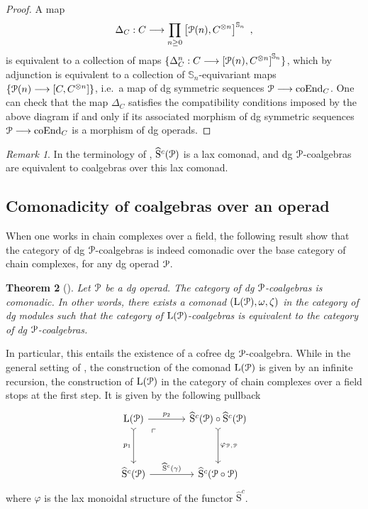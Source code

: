 \documentclass[a4paper,12pt]{amsart}
\renewcommand{\mathcal}{\EuScript}
\newcommand{\oneop}{\mathcal{P}}
\theoremstyle{plain}
\newtheorem{theorem}{Theorem}[section]
\theoremstyle{definition}
\theoremstyle{remark}
\newtheorem{remark}[theorem]{\sc Remark}%
\begin{document}
\begin{proof}
A map 
\[
\Delta_C: C \longrightarrow \displaystyle \prod_{n \geq 0} \left[\mathcal{P}(n),C^{\otimes n}\right]^{\mathbb{S}_n}~,
\]
is equivalent to a collection of maps $\{\Delta_C^n: C \longrightarrow \left[\mathcal{P}(n),C^{\otimes n}\right]^{\mathbb{S}_n}\}$, which by adjunction is equivalent to a collection of $\mathbb S_n$-equivariant maps $\{\mathcal{P}(n) \longrightarrow \left[C,C^{\otimes n}\right]\}$, i.e.\ a map of dg symmetric sequences $\mathcal{P} \longrightarrow \mathrm{coEnd}_C$. One can check that the map $\Delta_C$ satisfies the compatibility conditions imposed by the above diagram if and only if its associated morphism of dg symmetric sequences $\mathcal{P} \longrightarrow \mathrm{coEnd}_C$ is a morphism of dg operads.
\end{proof}

\begin{remark}
In the terminology of \cite{anelcofree2014}, $\widehat{\mathrm{S}}^c(\oneop)$ is a lax comonad, and dg $\oneop$-coalgebras are equivalent to coalgebras over this lax comonad. 
\end{remark}

\subsection{Comonadicity of coalgebras over an operad}
When one works in chain complexes over a field, the following result show that the category of dg $\mathcal{P}$-coalgebras is indeed comonadic over the base category of chain complexes, for any dg operad $\mathcal{P}$. 

\begin{theorem}[{\cite[Theorem 2.7.11]{anelcofree2014}}]\label{thm: cofree coalgebra over an operad}
Let $\oneop$ be a dg operad. The category of dg $\oneop$-coalgebras is comonadic. In other words, there exists a comonad $(\mathrm{L}(\oneop), \omega, \zeta)$ in the category of dg modules such that the category of $\mathrm{L}(\oneop)$-coalgebras is equivalent to the category of dg $\oneop$-coalgebras.
\end{theorem}

In particular, this entails the existence of a cofree dg $\oneop$-coalgebra. While in the general setting of \cite{anelcofree2014}, the construction of the comonad $\mathrm{L}(\oneop)$ is given by an infinite recursion, the construction of $\mathrm{L}(\oneop)$ in the category of chain complexes over a field stops at the first step. It is given by the following pullback 
\[
\begin{tikzcd}[column sep=3pc,row sep=3pc]
\mathrm{L}(\oneop) \arrow[r,"p_2"] \arrow[d,"p_1",swap,rightarrowtail] \arrow[dr, phantom, "\ulcorner", very near start]
&\widehat{\mathrm{S}}^c(\oneop) \circ \widehat{\mathrm{S}}^c(\oneop) \arrow[d,"\varphi_{\oneop,\oneop}",rightarrowtail] \\
\widehat{\mathrm{S}}^c(\oneop) \arrow[r,"\widehat{\mathrm{S}}^c(\gamma)"]
&\widehat{\mathrm{S}}^c(\oneop \circ \oneop)
\end{tikzcd}
\]
where $\varphi$ is the lax monoidal structure of the functor $\widehat{\mathrm{S}}^c$.
\end{document}
